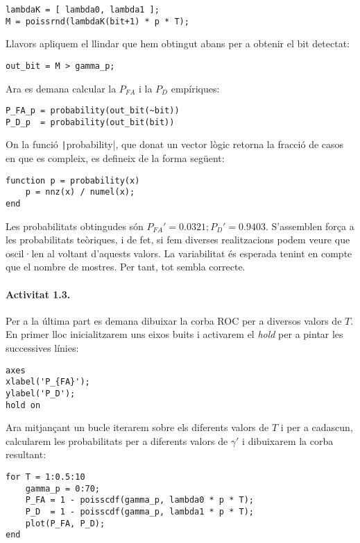 \documentclass[catalan]{scrartcl}
\begin{document}
\begin{verbatim}
lambdaK = [ lambda0, lambda1 ];
M = poissrnd(lambdaK(bit+1) * p * T);
\end{verbatim}

Llavors apliquem el llindar que hem obtingut abans per a obtenir el bit detectat:

\begin{verbatim}
out_bit = M > gamma_p;
\end{verbatim}

Ara es demana calcular la $P_{FA}$ i la $P_D$ empíriques:

\begin{verbatim}
P_FA_p = probability(out_bit(~bit))
P_D_p  = probability(out_bit(bit))
\end{verbatim}

On la funció \texttt|probability|, que donat un vector
lògic retorna la fracció de casos en que es compleix, es defineix de la forma següent:

\begin{verbatim}
function p = probability(x)
    p = nnz(x) / numel(x);
end
\end{verbatim}

Les probabilitats obtingudes són $P_{FA}' = 0.0321; P_D' = 0.9403$.
S'assemblen força a les probabilitats teòriques, i de fet, si
fem diverses realitzacions podem veure que oscil·len al voltant d'aquests
valors. La variabilitat és esperada tenint en compte que el nombre de mostres.
Per tant, tot sembla correcte.

\paragraph{Activitat 1.3.}

Per a la última part es demana dibuixar la corba ROC per a diversos valors
de $T$. En primer lloc inicialitzarem uns eixos buits i activarem el
\emph{hold} per a pintar les successives línies:

\begin{verbatim}
axes
xlabel('P_{FA}');
ylabel('P_D');
hold on
\end{verbatim}

Ara mitjançant un bucle iterarem sobre els diferents valors de $T$ i per a cadascun, calcularem les probabilitats per a diferents valors de $\gamma'$
i dibuixarem la corba resultant:

\begin{verbatim}
for T = 1:0.5:10
    gamma_p = 0:70;
    P_FA = 1 - poisscdf(gamma_p, lambda0 * p * T);
    P_D  = 1 - poisscdf(gamma_p, lambda1 * p * T);
    plot(P_FA, P_D);
end
\end{verbatim}
\end{document}
